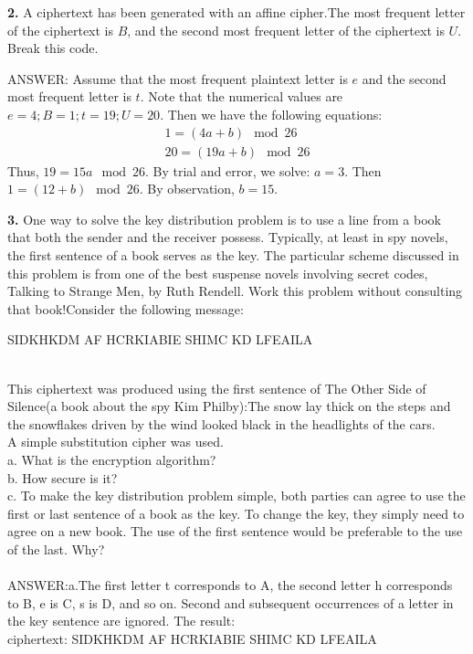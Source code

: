 \documentclass[paper=a4, fontsize=11pt]{scrartcl} %
\numberwithin{equation}{section} %
\numberwithin{figure}{section} %
\numberwithin{table}{section} %
\begin{document}
\textbf{2.} A ciphertext has been generated with an affine cipher.The most frequent letter of the ciphertext is $B$, and the second most frequent letter of the ciphertext is $U$. Break this code.

ANSWER:
 Assume that the most frequent plaintext letter is $e$ and the second
 most frequent letter is $t$. Note that the numerical values are $e =
 4; B = 1; t = 19; U = 20$. Then we have the following equations:
 \begin{eqnarray*}
        1 = (4a + b) \mod 26\\
        20 = (19a + b) \mod 26
 \end{eqnarray*}
 Thus, $19 = 15a \mod 26$. By trial and error, we solve: $a = 3$.
 Then $1 = (12 + b) \mod 26$. By observation, $b = 15$.

\textbf{3.} One way to solve the key distribution problem is to use a line from a book that both the sender and the receiver possess. Typically, at least in spy novels, the first sentence of a book serves as the key. The particular scheme discussed in this problem is from one of the best suspense novels involving secret codes, Talking to Strange Men, by Ruth Rendell. Work this problem without consulting that book!Consider the following message:\\
\centerline{SIDKHKDM AF HCRKIABIE SHIMC KD LFEAILA}\\
This ciphertext was produced using the first sentence of The Other Side of Silence(a book about the spy Kim Philby):The snow lay thick on the steps and the snowflakes driven by the wind looked black in the headlights of the cars.\\
A simple substitution cipher was used.\\
a. What is the encryption algorithm?\\
b. How secure is it?\\
c. To make the key distribution problem simple, both parties can agree to use the first or last sentence of a book as the key. To change the key, they simply need to agree on a new book. The use of the first sentence would be preferable to the use of the last. Why?\\
\\
ANSWER:a.The first letter t corresponds to A, the second letter h corresponds to B, e is C, s is D, and so on. Second and subsequent occurrences of a letter in the key sentence are ignored. The result:\\
ciphertext:  SIDKHKDM AF HCRKIABIE SHIMC KD LFEAILA\\
\end{document}
